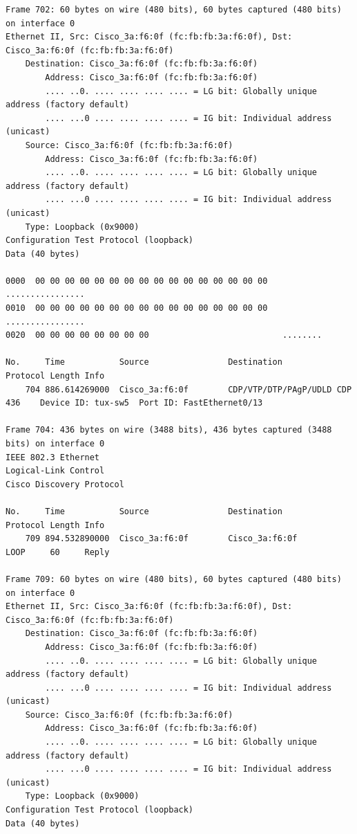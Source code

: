 \documentclass[a4paper,11pt]{article}
\begin{document}
\begin{lstlisting}
Frame 702: 60 bytes on wire (480 bits), 60 bytes captured (480 bits) on interface 0
Ethernet II, Src: Cisco_3a:f6:0f (fc:fb:fb:3a:f6:0f), Dst: Cisco_3a:f6:0f (fc:fb:fb:3a:f6:0f)
    Destination: Cisco_3a:f6:0f (fc:fb:fb:3a:f6:0f)
        Address: Cisco_3a:f6:0f (fc:fb:fb:3a:f6:0f)
        .... ..0. .... .... .... .... = LG bit: Globally unique address (factory default)
        .... ...0 .... .... .... .... = IG bit: Individual address (unicast)
    Source: Cisco_3a:f6:0f (fc:fb:fb:3a:f6:0f)
        Address: Cisco_3a:f6:0f (fc:fb:fb:3a:f6:0f)
        .... ..0. .... .... .... .... = LG bit: Globally unique address (factory default)
        .... ...0 .... .... .... .... = IG bit: Individual address (unicast)
    Type: Loopback (0x9000)
Configuration Test Protocol (loopback)
Data (40 bytes)

0000  00 00 00 00 00 00 00 00 00 00 00 00 00 00 00 00   ................
0010  00 00 00 00 00 00 00 00 00 00 00 00 00 00 00 00   ................
0020  00 00 00 00 00 00 00 00                           ........

No.     Time           Source                Destination           Protocol Length Info
    704 886.614269000  Cisco_3a:f6:0f        CDP/VTP/DTP/PAgP/UDLD CDP      436    Device ID: tux-sw5  Port ID: FastEthernet0/13  

Frame 704: 436 bytes on wire (3488 bits), 436 bytes captured (3488 bits) on interface 0
IEEE 802.3 Ethernet 
Logical-Link Control
Cisco Discovery Protocol

No.     Time           Source                Destination           Protocol Length Info
    709 894.532890000  Cisco_3a:f6:0f        Cisco_3a:f6:0f        LOOP     60     Reply

Frame 709: 60 bytes on wire (480 bits), 60 bytes captured (480 bits) on interface 0
Ethernet II, Src: Cisco_3a:f6:0f (fc:fb:fb:3a:f6:0f), Dst: Cisco_3a:f6:0f (fc:fb:fb:3a:f6:0f)
    Destination: Cisco_3a:f6:0f (fc:fb:fb:3a:f6:0f)
        Address: Cisco_3a:f6:0f (fc:fb:fb:3a:f6:0f)
        .... ..0. .... .... .... .... = LG bit: Globally unique address (factory default)
        .... ...0 .... .... .... .... = IG bit: Individual address (unicast)
    Source: Cisco_3a:f6:0f (fc:fb:fb:3a:f6:0f)
        Address: Cisco_3a:f6:0f (fc:fb:fb:3a:f6:0f)
        .... ..0. .... .... .... .... = LG bit: Globally unique address (factory default)
        .... ...0 .... .... .... .... = IG bit: Individual address (unicast)
    Type: Loopback (0x9000)
Configuration Test Protocol (loopback)
Data (40 bytes)


\end{lstlisting}
\end{document}

